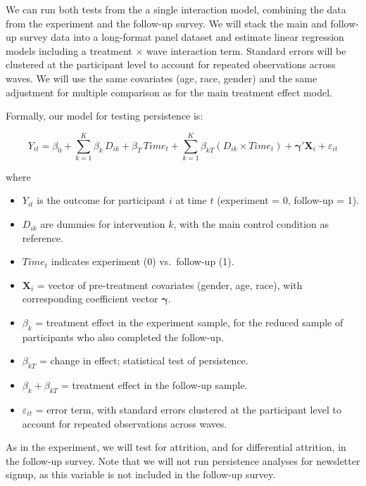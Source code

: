\documentclass[
  letterpaper,
  DIV=11,
  numbers=noendperiod]{scrartcl}
\providecommand{\tightlist}{%
  \setlength{\itemsep}{0pt}\setlength{\parskip}{0pt}}
\begin{document}
We can run both tests from the a single interaction model, combining the
data from the experiment and the follow-up survey. We will stack the
main and follow-up survey data into a long-format panel dataset and
estimate linear regression models including a treatment × wave
interaction term. Standard errors will be clustered at the participant
level to account for repeated observations across waves. We will use the
same covariates (age, race, gender) and the same adjustment for multiple
comparison as for the main treatment effect model.

Formally, our model for testing persistence is:

\[Y_{it} = \beta_0 + \sum_{k=1}^{K} \beta_k \, D_{ik} + \beta_T \, Time_t + \sum_{k=1}^{K} \beta_{kT} (D_{ik} \times Time_t) + \boldsymbol{\gamma}' \mathbf{X}_i + \varepsilon_{it}\]

where

\begin{itemize}
\tightlist
\item
  \(Y_{it}\) is the outcome for participant \(i\) at time \(t\)
  (experiment = 0, follow-up = 1).
\item
  \(D_{ik}\) are dummies for intervention \(k\), with the main control
  condition as reference.
\item
  \(Time_t\) indicates experiment (0) vs.~follow-up (1).
\item
  \(\mathbf{X}_i\) = vector of pre-treatment covariates (gender, age,
  race), with corresponding coefficient vector \(\boldsymbol{\gamma}\).
\item
  \(\beta_k\) = treatment effect in the experiment sample, for the
  reduced sample of participants who also completed the follow-up.
\item
  \(\beta_{kT}\) = change in effect; statistical test of persistence.
\item
  \(\beta_k + \beta_{kT}\) = treatment effect in the follow-up sample.
\item
  \(\varepsilon_{it}\) = error term, with standard errors clustered at
  the participant level to account for repeated observations across
  waves.
\end{itemize}

As in the experiment, we will test for attrition, and for differential
attrition, in the follow-up survey. Note that we will not run
persistence analyses for newsletter signup, as this variable is not
included in the follow-up survey.
\end{document}
